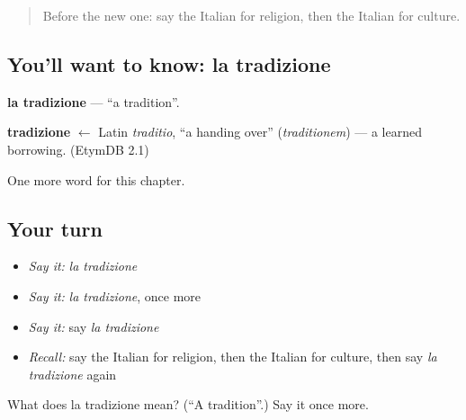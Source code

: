 \label{lesson:IT-C222-tradizione}



\begin{quote}
Before the new one: say the Italian for religion, then the Italian for culture.
\end{quote}

\subsection*{You'll want to know: la tradizione}
\textbf{la tradizione} — \textquotedblleft{}a tradition\textquotedblright{}.

\begin{cousinweb}
\textbf{tradizione} $\leftarrow$ Latin \emph{traditio}, \textquotedblleft{}a handing over\textquotedblright{} (\emph{traditionem}) — a learned borrowing. (EtymDB 2.1)
\end{cousinweb}

\begin{grammarlens}[title={What you've built}]
One more word for this chapter.
\end{grammarlens}

\subsection*{Your turn}
\begin{itemize}
\raggedright
  \item \emph{Say it:} \emph{la tradizione}
  \item \emph{Say it:} \emph{la tradizione}, once more
  \item \emph{Say it:} say \emph{la tradizione}
  \item \emph{Recall:} say the Italian for religion, then the Italian for culture, then say \emph{la tradizione} again
\end{itemize}

\begin{tcolorbox}[breakable,colback=teal!4,colframe=teal!35!black,title={Before you move on}]
What does la tradizione mean? (\textquotedblleft{}A tradition\textquotedblright{}.) Say it once more.
\end{tcolorbox}
